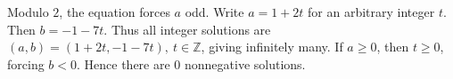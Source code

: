 Modulo $2$, the equation forces $a$ odd. Write $a=1+2t$ for an arbitrary integer $t$. Then $b=-1-7t$. Thus all integer solutions are $\boxed{(a,b)=(1+2t,-1-7t),\ t\in\mathbb Z}$, giving infinitely many. If $a\ge0$, then $t\ge0$, forcing $b<0$. Hence there are $\boxed0$ nonnegative solutions.
